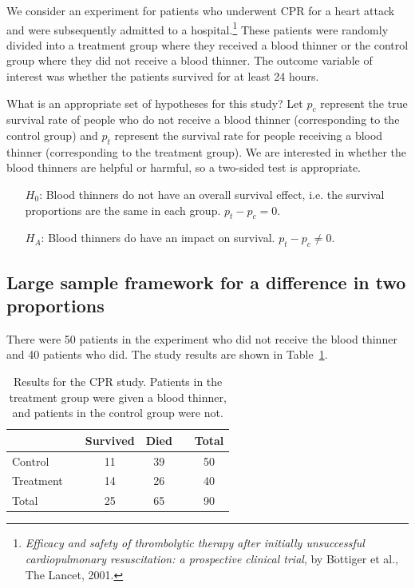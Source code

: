 We consider an experiment for patients who underwent CPR for a heart attack and were subsequently admitted to a hospital.\footnote{\emph{Efficacy and safety of thrombolytic therapy after initially unsuccessful cardiopulmonary resuscitation: a prospective clinical trial}, by B$\ddot{\text{o}}$ttiger et al., The Lancet, 2001.} These patients were randomly divided into a treatment group where they received a blood thinner or the control group where they did not receive a blood thinner. The outcome variable of interest was whether the patients survived for at least 24 hours.

\begin{example}{What is an appropriate set of hypotheses for this study? Let $p_c$ represent the true survival rate of people who do not receive a blood thinner (corresponding to the control group) and $p_t$ represent the survival rate for people receiving a blood thinner (corresponding to the treatment group).} \label{hypothesesForCPRStudyInSmallSampleSection}
We are interested in whether the blood thinners are helpful or harmful, so a two-sided test is appropriate.
\begin{itemize}
\item[$H_0$:] Blood thinners do not have an overall survival effect, i.e. the survival proportions are the same in each group. $p_t - p_c = 0$.
\item[$H_A$:] Blood thinners do have an impact on survival. $p_t - p_c \neq 0$.
\end{itemize}
\end{example}

\subsection{Large sample framework for a difference in two proportions}

There were 50 patients in the experiment who did not receive the blood thinner and 40 patients who did. The study results are shown in Table~\ref{resultsForCPRStudyInSmallSampleSection}.

\begin{table}[ht]
\centering
\begin{tabular}{lccccc}
\hline
			&& Survived 	& Died 	&& Total \\
\hline
Control		&& 11		& 39		&& 50 \\
Treatment		&& 14		& 26		&& 40 \\
\hline
Total			&& 25		& 65		&& 90 \\
\hline
\end{tabular}
\caption{Results for the CPR study. Patients in the treatment group were given a blood thinner, and patients in the control group were not.}
\label{resultsForCPRStudyInSmallSampleSection}
\end{table}

